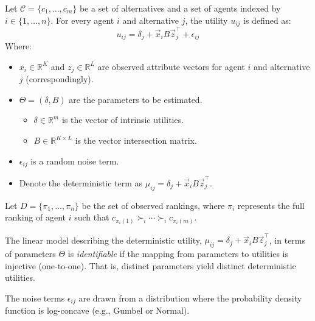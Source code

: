 \begin{definition}
    Let $\mathcal{C}=\{ c_{1},\dots,c_{m} \}$ be a set of alternatives and a set of agents indexed by $i \in \{ 1,\dots,n \}$.
    For every agent $i$ and alternative $j$, the utility $u_{ij}$ is defined as:
    $$
    u_{ij} = \delta_{j} + \vec{x}_{i} B \vec{z}^{\top}_{j} + \epsilon_{ij}
    $$
    Where:
    \begin{itemize}
        \item $x_{i} \in \mathbb{R}^K$ and $z_{j} \in \mathbb{R}^L$ are observed attribute vectors for agent $i$ and alternative $j$ (correspondingly).
        \item $\Theta=(\delta,B)$ are the parameters to be estimated.
        \begin{itemize}
        	\item $\delta \in \mathbb{R}^{m}$ is the vector of intrinsic utilities.
        	\item $B \in \mathbb{R}^{K \times L}$ is the vector intersection matrix.
        \end{itemize}
    	\item $\epsilon_{ij}$ is a random noise term.
        \item Denote the deterministic term as $\mu_{ij} = \delta_{j} + \vec{x}_{i} B \vec{z}^{\top}_{j}$.
    \end{itemize}
\end{definition}

\begin{definition}
    Let $D = \{ \pi_{1},\dots,\pi_{n} \}$ be the set of observed rankings,
    where $\pi_{i}$ represents the full ranking of agent $i$ such that $c_{\pi_{i}(1)} \succ_{i} \cdots \succ_{i} c_{\pi_{i}(m)}$.
\end{definition}

\begin{definition}[Identifiability]
    The linear model describing the deterministic utility, $\mu_{ij} = \delta_{j} + \vec{x}_{i} B \vec{z}^{\top}_{j}$, in terms of parameters $\Theta$ is \textit{identifiable} if the mapping from parameters to utilities is injective (one-to-one).
    That is, distinct parameters yield distinct deterministic utilities.
\end{definition}

\begin{definition}
    The noise terms $\epsilon_{ij}$ are drawn from a distribution where the probability density function is log-concave (e.g., Gumbel or Normal).
\end{definition}

